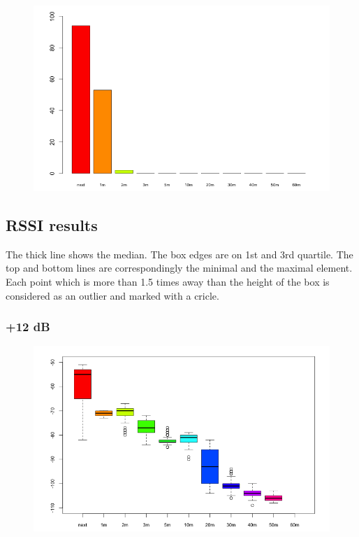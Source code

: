 \begin{figure}[H]
  \centering
  \includegraphics[width=1.0\textwidth]{img/tests/range/db_m30.png}
\end{figure}

\subsection{RSSI results}

The thick line shows the median.
The box edges are on 1st and 3rd quartile.
The top and bottom lines are correspondingly the minimal and the maximal element.
Each point which is more than 1.5 times away than the height of the box is considered as an outlier and marked with a cricle.

\subsubsection{+12 dB}

\begin{figure}[H]
  \centering
  \includegraphics[width=1.0\textwidth]{img/tests/rssi/db_12.png}
\end{figure}


